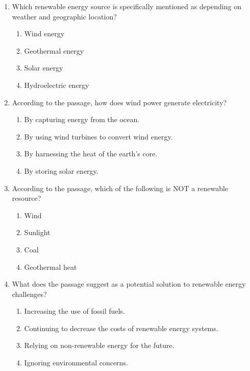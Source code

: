 \documentclass[12pt]{article}
\begin{document}
\begin{enumerate}
    \item Which renewable energy source is specifically mentioned as depending on weather and geographic location?
    \begin{enumerate}[label=\Alph*.]
        \item Wind energy
        \item Geothermal energy
        \item Solar energy
        \item Hydroelectric energy
    \end{enumerate}
    \vspace{0.5cm}

    \item According to the passage, how does wind power generate electricity?
    \begin{enumerate}[label=\Alph*.]
        \item By capturing energy from the ocean.
        \item By using wind turbines to convert wind energy.
        \item By harnessing the heat of the earth's core.
        \item By storing solar energy.
    \end{enumerate}
    \vspace{0.5cm}

    \item According to the passage, which of the following is NOT a renewable resource?
    \begin{enumerate}[label=\Alph*.]
        \item Wind
        \item Sunlight
        \item Coal
        \item Geothermal heat
    \end{enumerate}
    \vspace{0.5cm}

    \item What does the passage suggest as a potential solution to renewable energy challenges?
    \begin{enumerate}[label=\Alph*.]
        \item Increasing the use of fossil fuels.
        \item Continuing to decrease the costs of renewable energy systems.
        \item Relying on non-renewable energy for the future.
        \item Ignoring environmental concerns.
    \end{enumerate}
    \vspace{0.5cm}


\end{enumerate}
\end{document}
